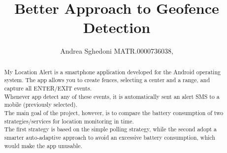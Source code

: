 \documentclass[conference]{IEEEtran}
\begin{document}
\title{Better Approach to Geofence Detection}

\author{
Andrea Sghedoni MATR.0000736038,
\\
}




\maketitle

\begin{abstract}
My Location Alert is a smartphone application developed for the Android operating system.
The app allows you to create fences, selecting a center and a range, and capture all ENTER/EXIT events.\\
Whenever app detect any of these events, it is automatically sent an alert SMS to a mobile (previously selected).\\
The main goal of the project, however, is to compare the battery consumption of two strategies/services for location monitoring in time.\\
The first strategy is based on the simple polling strategy, while the second adopt a smarter auto-adaptive approach to avoid an excessive battery consumption, which would make the app unusable.

\end{abstract}
\end{document}
